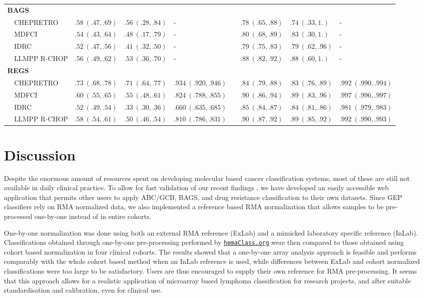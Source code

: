 \documentclass[10pt,letterpaper]{article}
\newcommand{\hemaClass}{\href{http://hemaClass.org}{\texttt{hemaClass.org}}}
\begin{document}
\begin{table}[!tbp]
\begin{adjustwidth}{-1in}{0in}
{\begin{center}
\begin{tabular}{llllclll}
					\hline
					{\bfseries BAGS}&&&&&&&\tabularnewline
					~~CHEPRETRO&$.58~(.47, .69)$&$.56~(.28, .84)$&-&&$.78~(.65, .88)$&$.74~(.33, 1.)$&-\tabularnewline
					~~MDFCI&$.54~(.43, .64)$&$.48~(.17, .79)$&-&&$.80~(.68, .89)$&$.83~(.30, 1.)$&-\tabularnewline
					~~IDRC&$.52~(.47, .56)$&$.41~(.32, .50)$&-&&$.79~(.75, .83)$&$.79~(.62, .96)$&-\tabularnewline
					~~LLMPP R-CHOP&$.56~(.49, .62)$&$.53~(.36, .70)$&-&&$.88~(.82, .92)$&$.88~(.60, 1.)$&-\tabularnewline
					\hline
					{\bfseries REGS}&&&&&&&\tabularnewline
					~~CHEPRETRO&$.73~(.68, .78)$&$.71~(.64, .77)$&$.934~(.920, .946)$&&$.84~(.79, .88)$&$.83~(.76, .89)$&$.992~(.990, .994)$\tabularnewline
					~~MDFCI&$.60~(.55, .65)$&$.55~(.48, .61)$&$.824~(.788, .855)$&&$.90~(.86, .94)$&$.89~(.83, .96)$&$.997~(.996, .997)$\tabularnewline
					~~IDRC&$.52~(.49, .54)$&$.33~(.30, .36)$&$.660~(.635, .685)$&&$.85~(.84, .87)$&$.84~(.81, .86)$&$.981~(.979, .983)$\tabularnewline
					~~LLMPP R-CHOP&$.58~(.54, .61)$&$.50~(.46, .54)$&$.810~(.786, .831)$&&$.90~(.87, .92)$&$.89~(.85, .92)$&$.992~(.990, .993)$\tabularnewline
					\hline
				\end{tabular}
			\end{center}}
		\end{adjustwidth}
\end{table}

\section*{Discussion}
Despite the enormous amount of resources spent on developing molecular based cancer classification systems,
most of these are still not available in daily clinical practice.
To allow for fast validation of our recent findings \cite{DybkaerBoegsted2015, Falgreen2015}, we have developed an easily accessible web application that permits other users to apply ABC/GCB, BAGS, and drug resistance classification to their own datasets. Since GEP classifiers rely on RMA normalized data, we also implemented a reference based RMA normalization that allows samples to be pre-processed one-by-one instead of in entire cohorts.

One-by-one normalization was done using both an external RMA reference (ExLab) and a mimicked laboratory specific reference (InLab). Classifications obtained through one-by-one pre-processing performed by \hemaClass{} were then compared to those obtained using cohort based normalization in four clinical cohorts. The results showed that a one-by-one array analysis approach is feasible and performs comparably with the whole cohort based method when an InLab reference is used, while differences between ExLab and cohort normalized classifications were too large to be satisfactory. Users are thus encouraged to supply their own reference for RMA pre-processing. It seems that this approach allows for a realistic application of microarray based lymphoma classification for research projects, and after suitable standardisation and calibration, even for clinical use.
\end{document}
